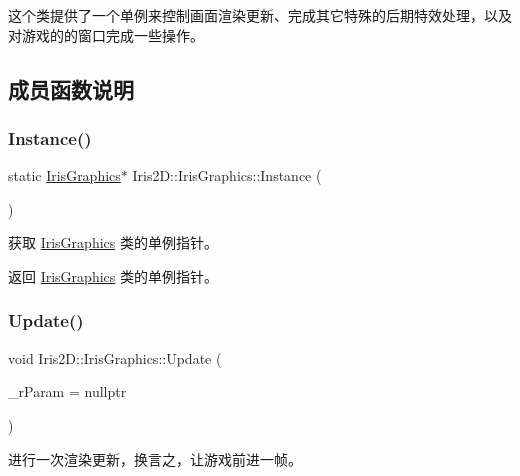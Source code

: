 这个类提供了一个单例来控制画面渲染更新、完成其它特殊的后期特效处理，以及对游戏的的窗口完成一些操作。 

\subsection{成员函数说明}
\mbox{\label{class_iris2_d_1_1_iris_graphics_a25533fd69478336d60c5b1f639802d3a}} 
\subsubsection{\texorpdfstring{Instance()}{Instance()}}
{\footnotesize\ttfamily static \hyperlink{class_iris2_d_1_1_iris_graphics}{Iris\+Graphics}$\ast$ Iris2\+D\+::\+Iris\+Graphics\+::\+Instance (\begin{DoxyParamCaption}{ }\end{DoxyParamCaption})\hspace{0.3cm}{\ttfamily [static]}}



获取 \hyperlink{class_iris2_d_1_1_iris_graphics}{Iris\+Graphics} 类的单例指针。 

\begin{DoxyReturn}{返回}
\hyperlink{class_iris2_d_1_1_iris_graphics}{Iris\+Graphics} 类的单例指针。 
\end{DoxyReturn}
\mbox{\label{class_iris2_d_1_1_iris_graphics_aa25debfc9a08d7084f48711a6bffdc4d}} 
\subsubsection{\texorpdfstring{Update()}{Update()}}
{\footnotesize\ttfamily void Iris2\+D\+::\+Iris\+Graphics\+::\+Update (\begin{DoxyParamCaption}\item[{Iris\+Result $\ast$}]{\+\_\+r\+Param = {\ttfamily nullptr} }\end{DoxyParamCaption})}



进行一次渲染更新，换言之，让游戏前进一帧。 

